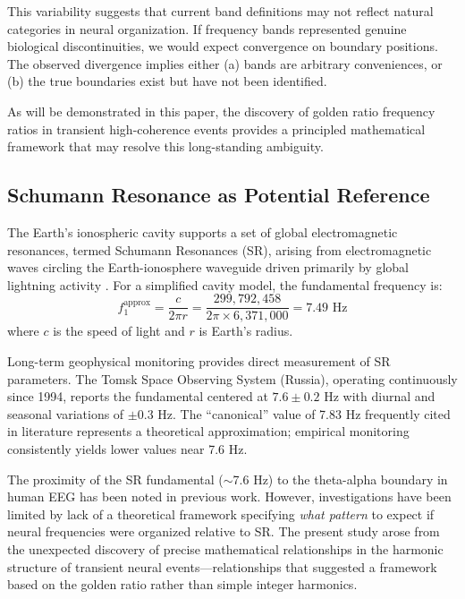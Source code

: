 \documentclass[11pt,a4paper]{article}
\begin{document}
This variability suggests that current band definitions may not reflect natural categories in neural organization. If frequency bands represented genuine biological discontinuities, we would expect convergence on boundary positions. The observed divergence implies either (a) bands are arbitrary conveniences, or (b) the true boundaries exist but have not been identified.

As will be demonstrated in this paper, the discovery of golden ratio frequency ratios in transient high-coherence events provides a principled mathematical framework that may resolve this long-standing ambiguity.

\subsection{Schumann Resonance as Potential Reference}

The Earth's ionospheric cavity supports a set of global electromagnetic resonances, termed Schumann Resonances (SR), arising from electromagnetic waves circling the Earth-ionosphere waveguide driven primarily by global lightning activity \parencite{schumann1952strahlungslosen, nickolaenko2014schumann}. For a simplified cavity model, the fundamental frequency is:
\begin{equation}
f_1^{\text{approx}} = \frac{c}{2\pi r} = \frac{299,792,458}{2\pi \times 6,371,000} = 7.49 \text{ Hz}
\end{equation}
where $c$ is the speed of light and $r$ is Earth's radius.

Long-term geophysical monitoring provides direct measurement of SR parameters. The Tomsk Space Observing System (Russia), operating continuously since 1994, reports the fundamental centered at $7.6 \pm 0.2$ Hz with diurnal and seasonal variations of $\pm 0.3$ Hz. The ``canonical'' value of 7.83 Hz frequently cited in literature represents a theoretical approximation; empirical monitoring consistently yields lower values near 7.6 Hz.

The proximity of the SR fundamental ($\sim$7.6 Hz) to the theta-alpha boundary in human EEG has been noted in previous work. However, investigations have been limited by lack of a theoretical framework specifying \textit{what pattern} to expect if neural frequencies were organized relative to SR. The present study arose from the unexpected discovery of precise mathematical relationships in the harmonic structure of transient neural events---relationships that suggested a framework based on the golden ratio rather than simple integer harmonics.
\end{document}
